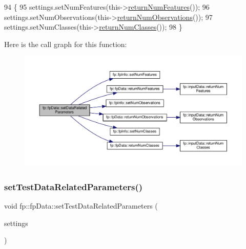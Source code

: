 \begin{DoxyCode}
94                                                                   \{
95                 settings.setNumFeatures(this->\hyperlink{classfp_1_1fpData_a95088e33b280e5c82b3543033d8852e1}{returnNumFeatures}());
96                 settings.setNumObservations(this->\hyperlink{classfp_1_1fpData_a9056a8c0e7e48fe9aa591269064ecc43}{returnNumObservations}());
97                 settings.setNumClasses(this->\hyperlink{classfp_1_1fpData_a7abfc93af30b7262d59b6d304796a09d}{returnNumClasses}());
98             \}
\end{DoxyCode}
Here is the call graph for this function\+:
\nopagebreak
\begin{figure}[H]
\begin{center}
\leavevmode
\includegraphics[width=350pt]{classfp_1_1fpData_ab48923d57206e17b88f0d89833051b43_cgraph}
\end{center}
\end{figure}
\mbox{\label{classfp_1_1fpData_ab60d2098334e253a0bf3115f029c1996}} 
\subsubsection{\texorpdfstring{set\+Test\+Data\+Related\+Parameters()}{setTestDataRelatedParameters()}}
{\footnotesize\ttfamily void fp\+::fp\+Data\+::set\+Test\+Data\+Related\+Parameters (\begin{DoxyParamCaption}\item[{\hyperlink{classfp_1_1fpInfo}{fp\+Info} \&}]{settings }\end{DoxyParamCaption})\hspace{0.3cm}{\ttfamily [inline]}}




